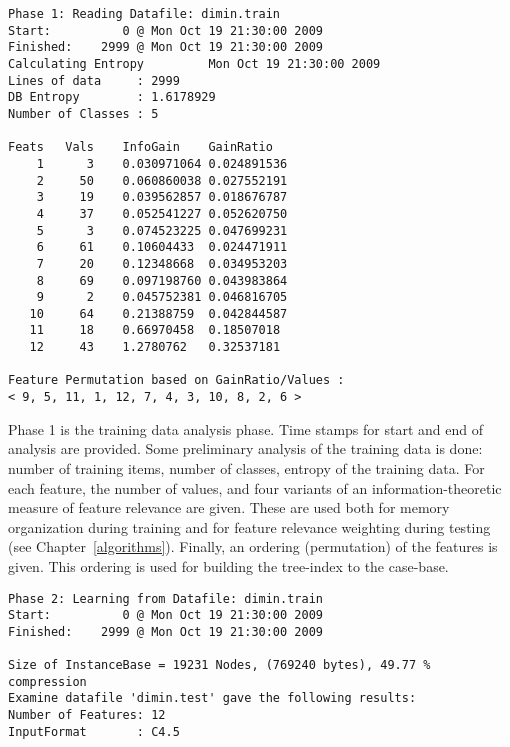 \documentclass{report}
\begin{document}
{\footnotesize
\begin{verbatim}
Phase 1: Reading Datafile: dimin.train
Start:          0 @ Mon Oct 19 21:30:00 2009
Finished:    2999 @ Mon Oct 19 21:30:00 2009
Calculating Entropy         Mon Oct 19 21:30:00 2009
Lines of data     : 2999
DB Entropy        : 1.6178929
Number of Classes : 5

Feats	Vals	InfoGain	GainRatio
    1      3	0.030971064	0.024891536
    2     50	0.060860038	0.027552191
    3     19	0.039562857	0.018676787
    4     37	0.052541227	0.052620750
    5      3	0.074523225	0.047699231
    6     61	0.10604433	0.024471911
    7     20	0.12348668	0.034953203
    8     69	0.097198760	0.043983864
    9      2	0.045752381	0.046816705
   10     64	0.21388759	0.042844587
   11     18	0.66970458	0.18507018
   12     43	1.2780762	0.32537181

Feature Permutation based on GainRatio/Values :
< 9, 5, 11, 1, 12, 7, 4, 3, 10, 8, 2, 6 >
\end{verbatim}
}



Phase 1 is the training data analysis phase. Time stamps for start and
end of analysis are provided. Some preliminary analysis of the
training data is done: number of training items, number of classes,
entropy of the training data. For each feature, the number of values,
and four variants of an information-theoretic measure of feature
relevance are given. These are used both for memory organization
during training and for feature relevance weighting during testing
(see Chapter~\ref{algorithms}). Finally, an ordering (permutation) of
the features is given. This ordering is used for building the
tree-index to the case-base.




{\footnotesize
\begin{verbatim}
Phase 2: Learning from Datafile: dimin.train
Start:          0 @ Mon Oct 19 21:30:00 2009
Finished:    2999 @ Mon Oct 19 21:30:00 2009

Size of InstanceBase = 19231 Nodes, (769240 bytes), 49.77 % compression
Examine datafile 'dimin.test' gave the following results:
Number of Features: 12
InputFormat       : C4.5
\end{verbatim}
}

\end{document}
